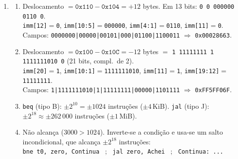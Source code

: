 \documentclass[11pt, a4paper]{article}
\begin{document}
\begin{enumerate}
\item \begin{enumerate}
  \item Deslocamento $= \texttt{0x110} - \texttt{0x104} = +12$ bytes. Em 13 bits: \texttt{0\,0\,000000\,0110\,0}.\\
  \texttt{imm[12]}$=$\texttt{0}, \texttt{imm[10:5]}$=$\texttt{000000}, \texttt{imm[4:1]}$=$\texttt{0110}, \texttt{imm[11]}$=$\texttt{0}.\\
  Campos: \texttt{0000000|00000|00101|000|01100|1100011} $\Rightarrow$ \texttt{0x00028663}.
  \item Deslocamento $= \texttt{0x100} - \texttt{0x10C} = -12$ bytes $=$ \texttt{1\,11111111\,1\,1111111010\,0} (21 bits, compl.\ de 2).\\
  \texttt{imm[20]}$=$\texttt{1}, \texttt{imm[10:1]}$=$\texttt{1111111010}, \texttt{imm[11]}$=$\texttt{1}, \texttt{imm[19:12]}$=$\texttt{11111111}.\\
  Campos: \texttt{1|1111111010|1|11111111|00000|1101111} $\Rightarrow$ \texttt{0xFF5FF06F}.
  \item \texttt{beq} (tipo B): $\pm 2^{10} = \pm 1024$ instru\c{c}\~{o}es ($\pm 4$\,KiB). \texttt{jal} (tipo J): $\pm 2^{18} \approx \pm 262\,000$ instru\c{c}\~{o}es ($\pm 1$\,MiB).
  \item N\~{a}o alcan\c{c}a ($3000 > 1024$). Inverte-se a condi\c{c}\~{a}o e usa-se um salto incondicional, que alcan\c{c}a $\pm 2^{18}$ instru\c{c}\~{o}es:\\
  \texttt{bne t0, zero, Continua} \ ; \ \texttt{jal zero, Achei} \ ; \ \texttt{Continua: ...}
\end{enumerate}


\end{enumerate}
\end{document}
